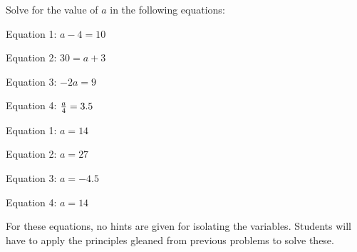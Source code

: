 

Solve for the value of $a$ in the following equations:

\vskip 20pt

Equation 1: $a - 4 = 10$

\vskip 10pt

Equation 2: $30 = a + 3$

\vskip 10pt

Equation 3: $-2a = 9$

\vskip 10pt

Equation 4: ${a \over 4} = 3.5$

\vskip 20pt







Equation 1: $a = 14$

\vskip 10pt

Equation 2: $a = 27$

\vskip 10pt

Equation 3: $a = -4.5$

\vskip 10pt

Equation 4: $a = 14$







For these equations, no hints are given for isolating the variables.  Students will have to apply the principles gleaned from previous problems to solve these.




